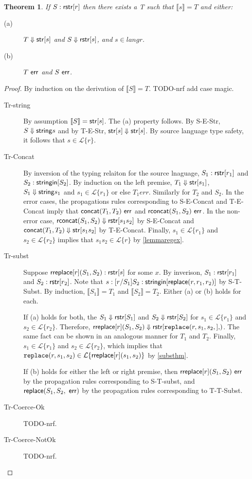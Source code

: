 \documentclass[10pt,preprint]{sigplanconf}
\newtheorem{thm}{Theorem}
\theoremstyle{definition}
\newcommand{\Lagr}{\mathcal{L}}
\newcommand{\lang}[1]{\Lagr\{#1\}}
\newcommand{\sisubst}[3]{{\sf rreplace}[#1](#2,#3)}
\newcommand{\sistr}[1]{{\sf rstr}[#1]}
\newcommand{\strin}[1]{\sistr{#1}}
\newcommand{\rsconcat}[2]{{\sf rconcat}(#1,#2)}
\newcommand{\stringin}[1]{{\sf stringin}[#1]}
\newcommand{\tsubst}[3]{{\sf replace}(#1,#2,#3)} %
\renewcommand{\tstr}[1]{{{\sf str}[#1]}}
\newcommand{\tconcat}[2]{{\sf concat}(#1,#2)}
\newcommand{\str}{{\sf string}}
\newcommand{\dosubst}[3]{{\tt replace}(#1,#2,#3)}
\newcommand{\err}{\ {\sf err}}
\newcommand{\trden}[1]{\llbracket #1 \rrbracket} %
\newcommand{\treduces}{ \Downarrow }
\newcommand{\sreduces}{ \Downarrow }
\begin{document}
\begin{thm}
If $S : \strin{r}$ then there exists a T such that $\trden{s} = T$ and either: 
\begin{description}
  \item[(a)] $T \treduces \tstr{s}$ and $S \sreduces \strin{s}$, and $s \in lang{r}$.
  \item[(b)] $T \err$ and $S \err$.
  \end{description}
\end{thm}
\begin{proof}
By induction on the derivation of $\trden{S} = T$. TODO-nrf add case magic.
\begin{description}
\item[Tr-string] By assumption $\trden{S} = \tstr{s}$. The (a) property follows.
By S-E-Str, $S \sreduces \str{s}$ and by T-E-Str, $\tstr{s} \treduces \tstr{s}$.
By source language type safety, it follows that $s \in \lang{r}$.
\item[Tr-Concat]
By inversion of the typing relaiton for the source lnaguage, $S_1 : \strin{r_1}$ and $S_2 : \stringin{S_2}$.
By induction on the left premise, $T_1 \treduces \tstr{s_1}$, $S_1 \sreduces \str{s_1}$ and $s_1 \in \lang{r_1}$
or else $T_1 err$. 
Similarly for $T_2$ and $S_2$.
In the error cases, the propagations rules corresponding to S-E-Concat and T-E-Concat imply that $\tconcat{T_1}{T_2} \err$ and $\rsconcat{S_1}{S_2} \err$.
In the non-error case, $\rsconcat{S_1}{S_2} \sreduces \strin{s_1 s_2}$ by S-E-Concat and $\tconcat{T_1}{T_2} \treduces \tstr{s_1 s_2}$ by T-E-Concat.
Finally, $s_1 \in \lang{r_1}$ and $s_2 \in \lang{r_2}$ implies that $s_1 s_2 \in \lang{r}$ by \ref{lemmaregex}.
\item[Tr-subst]
Suppose $\sisubst{r}{S_1}{S_2} : \strin{s}$ for some $x$. 
By inverison, $S_1 : \strin{r_1}$ and $S_2 : \strin{r_2}$.
Note that $s : \subst{r}{S_1}{S_2} : \stringin{\tsubst{r}{r_1}{r_2}}$ by S-T-Subst.
By induction, $\trden{S_1} = T_1$ and $\trden{S_2} = T_2$.
Either (a) or (b) holds for each.

If (a) holds for both, the $S_1 \sreduces \strin{S_1}$ and $S_2 \sreduces \strin{S_2}$ for $s_1 \in \lang{r_1}$ and $s_2 \in \lang{r_2}$.
Therefore, $\sisubst{r}{S_1}{S_2} \sreduces \strin{\dosubst{r,s_1,s_2}}$.
The same fact can be shown in an analogous manner for $T_1$ and $T_2$.
Finally, $s_1 \in \lang{r_1}$ and $s_2 \in \lang{r_2}$, which implies that $\dosubst{r}{s_1}{s_2} \in \lang{\sisubst{r}{s_1}{s_2}}$ by \ref{substhm}.

If (b) holds for either the left or right premise, then $\sisubst{r}{S_1}{S_2} \err$ by the propagation rules corresponding to S-T-subst, 
and $\tsubst{S_1}{S_2} \err$ by the propagation rules corresponding to T-T-Subst.

\item[Tr-Coerce-Ok] TODO-nrf.

\item[Tr-Coerce-NotOk] TODO-nrf.

\end{description}
\end{proof}
\end{document}
